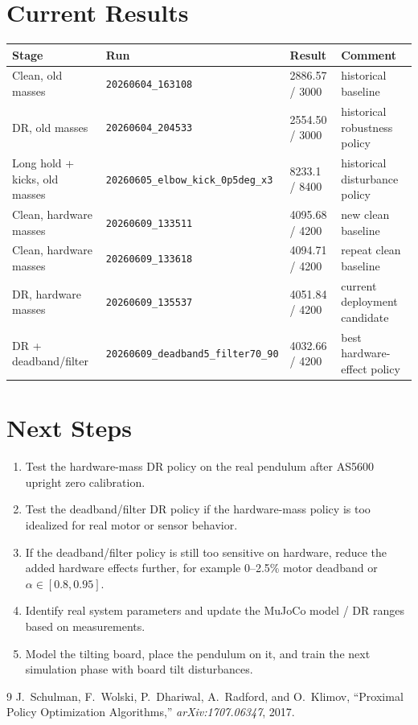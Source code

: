 \documentclass[11pt,a4paper]{article}
\begin{document}
\section{Current Results}

\begin{center}
\begin{tabular}{llll}
\toprule
\textbf{Stage} & \textbf{Run} & \textbf{Result} & \textbf{Comment} \\
\midrule
Clean, old masses & \texttt{20260604\_163108} & 2886.57 / 3000 & historical baseline \\
DR, old masses & \texttt{20260604\_204533} & 2554.50 / 3000 & historical robustness policy \\
Long hold + kicks, old masses & \texttt{20260605\_elbow\_kick\_0p5deg\_x3} & 8233.1 / 8400 & historical disturbance policy \\
Clean, hardware masses & \texttt{20260609\_133511} & 4095.68 / 4200 & new clean baseline \\
Clean, hardware masses & \texttt{20260609\_133618} & 4094.71 / 4200 & repeat clean baseline \\
DR, hardware masses & \texttt{20260609\_135537} & 4051.84 / 4200 & current deployment candidate \\
DR + deadband/filter & \texttt{20260609\_deadband5\_filter70\_90} & 4032.66 / 4200 & best hardware-effect policy \\
\bottomrule
\end{tabular}
\end{center}

\section{Next Steps}

\begin{enumerate}
    \item Test the hardware-mass DR policy on the real pendulum after AS5600
          upright zero calibration.
    \item Test the deadband/filter DR policy if the hardware-mass policy is too
          idealized for real motor or sensor behavior.
    \item If the deadband/filter policy is still too sensitive on hardware,
          reduce the added hardware effects further, for example 0--2.5\%
          motor deadband or $\alpha\in[0.8,0.95]$.
    \item Identify real system parameters and update the MuJoCo model / DR
          ranges based on measurements.
    \item Model the tilting board, place the pendulum on it, and train the next
          simulation phase with board tilt disturbances.
\end{enumerate}

\begin{thebibliography}{9}
J.~Schulman, F.~Wolski, P.~Dhariwal, A.~Radford, and O.~Klimov,
``Proximal Policy Optimization Algorithms,'' \textit{arXiv:1707.06347}, 2017.
\end{thebibliography}
\end{document}

